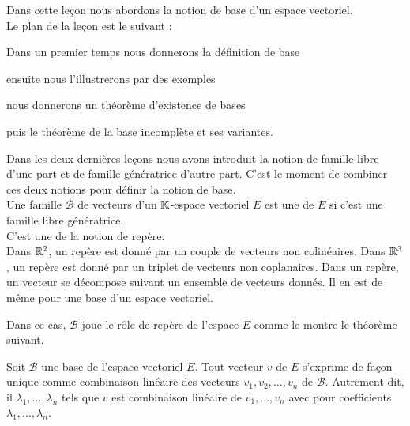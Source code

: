 






\debuttexte


\diapo


Dans cette le\c{c}on nous abordons la notion  de base d'un espace vectoriel. \\

\change
Le plan de la le\c{c}on est le suivant :

\change
Dans un premier temps nous donnerons la définition de base

\change
ensuite nous l'illustrerons par des exemples

\change
nous donnerons un théorème d'existence de bases

\change
puis le théorème de la base incomplète et ses variantes.
% 

\diapo

Dans les deux dernières le\c{c}ons nous avons introduit la notion de 
famille libre d'une part et de famille génératrice d'autre part. C'est le moment de combiner ces deux notions pour définir la notion de base.\\

Une famille $\mathcal{B}$ de vecteurs d'un $\mathbb{K}$-espace vectoriel $E$ 
est une  de $E$
si c'est une famille libre  génératrice.\\

C'est une  de la notion de repère. \\

Dans $\mathbb{R}^2$, un repère est donné par un couple de vecteurs 
non colinéaires. Dans $\mathbb{R}^ 3$, un repère est donné par un 
triplet de vecteurs non coplanaires.  
Dans un repère, 
un vecteur se décompose suivant un ensemble de vecteurs donnés. 
Il en est de même pour une base d'un espace vectoriel. 



Dans ce cas, $\mathcal{B}$ joue le rôle de repère de l'espace $E$ 
comme le montre le théorème suivant.


\change
Soit $\mathcal{B}$ une base de l'espace vectoriel $E$.
Tout vecteur $v$ de $E$ s'exprime de façon unique comme combinaison 
linéaire des vecteurs  $v_1, v_2, \dots , v_n$ de $\mathcal{B}$.
Autrement dit, il   $\lambda_1,\ldots,\lambda_n$ 
 tels que $v$ est combinaison linéaire de $v_1, \dots , v_n$ avec pour coefficients $\lambda_1,\ldots,\lambda_n$.

